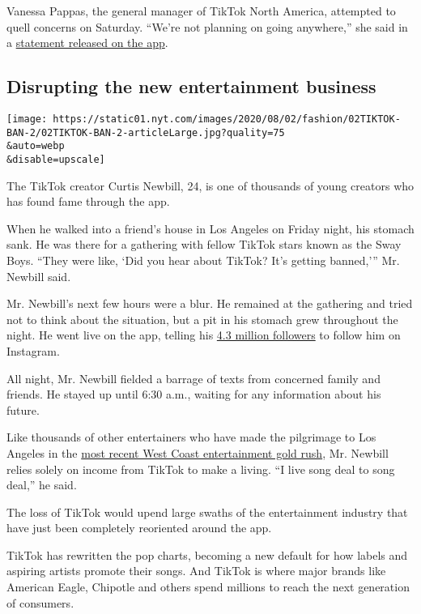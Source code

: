 Vanessa Pappas, the general manager of TikTok North America, attempted
to quell concerns on Saturday. ``We're not planning on going anywhere,''
she said in a
\href{https://twitter.com/TaylorLorenz/status/1289579919358545920}{statement
released on the app}.

\hypertarget{disrupting-the-new-entertainment-business}{%
\subsection{Disrupting the new entertainment
business}\label{disrupting-the-new-entertainment-business}}

\texttt{[image: https://static01.nyt.com/images/2020/08/02/fashion/02TIKTOK-BAN-2/02TIKTOK-BAN-2-articleLarge.jpg?quality=75\\\&auto=webp\\\&disable=upscale]}

The TikTok creator Curtis Newbill, 24, is one of thousands of young
creators who has found fame through the app.

When he walked into a friend's house in Los Angeles on Friday night, his
stomach sank. He was there for a gathering with fellow TikTok stars
known as the Sway Boys. ``They were like, `Did you hear about TikTok?
It's getting banned,''' Mr. Newbill said.

Mr. Newbill's next few hours were a blur. He remained at the gathering
and tried not to think about the situation, but a pit in his stomach
grew throughout the night. He went live on the app, telling his
\href{https://www.tiktok.com/@curtisnewbill}{4.3 million followers} to
follow him on Instagram.

All night, Mr. Newbill fielded a barrage of texts from concerned family
and friends. He stayed up until 6:30 a.m., waiting for any information
about his future.

Like thousands of other entertainers who have made the pilgrimage to Los
Angeles in the
\href{https://www.nytimes.com/2020/01/03/style/hype-house-los-angeles-tik-tok.html}{most
recent West Coast entertainment gold rush}, Mr. Newbill relies solely on
income from TikTok to make a living. ``I live song deal to song deal,''
he said.

The loss of TikTok would upend large swaths of the entertainment
industry that have just been completely reoriented around the app.

TikTok has rewritten the pop charts, becoming a new default for how
labels and aspiring artists promote their songs. And TikTok is where
major brands like American Eagle, Chipotle and others spend millions to
reach the next generation of consumers.

